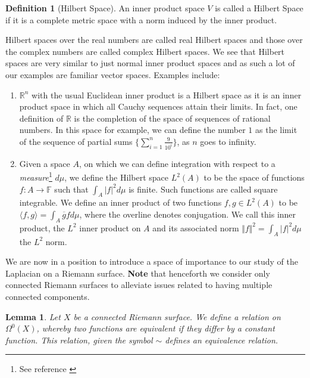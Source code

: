 \documentclass[11pt]{report}
\newtheorem{lemma}[thm]{Lemma}
\theoremstyle{definition}
\newtheorem{defn}[thm]{Definition}
\begin{document}
\begin{defn}[Hilbert Space]
  An inner product space $V$ is called a Hilbert Space if it is a complete metric space with a norm induced by the inner product.
\end{defn}
Hilbert spaces over the real numbers are called real Hilbert spaces and those over the complex numbers are called complex Hilbert spaces. We see that Hilbert spaces are very similar to just normal inner product spaces and as such a lot of our examples are familiar vector spaces. Examples include:
\begin{enumerate}
  \item $\mathbb{R}^n$ with the usual Euclidean inner product is a Hilbert space as it is an inner product space in which all Cauchy sequences attain their limits. In fact, one definition of $\mathbb{R}$ is the completion of the space of sequences of rational numbers. In this space for example, we can define the number $1$ as the limit of the sequence of partial sums $\{\sum\limits_{i=1}^n\frac{9}{10^i}\}$, as $n$ goes to infinity.
  \item Given a space $A$, on which we can define integration with respect to a \emph{measure}\footnote{See reference \cite[Chapter 11]{babyRudin}} $d\mu$, we define the Hilbert space $L^2(A)$ to be the space of functions $f: A \rightarrow \mathbb{F}$ such that $\int_A |f|^2 d\mu$ is finite. Such functions are called square integrable. We define an inner product of two functions $f,g \in L^2(A)$ to be $\langle f, g\rangle = \int_A \overline{g} f d\mu$, where the overline denotes conjugation. We call this inner product, the $L^2$ inner product on $A$ and its associated norm $\Vert f \Vert^2 = \int_A |f|^2 d\mu$ the $L^2$ norm.
\end{enumerate}

We are now in a position to introduce a space of importance to our study of the Laplacian on a Riemann surface. \textbf{Note} that henceforth we consider only connected Riemann surfaces to alleviate issues related to having multiple connected components.

\begin{lemma}
  Let $X$ be a connected Riemann surface. We define a relation on $\Omega^0(X)$, whereby two functions are equivalent if they differ by a constant function. This relation, given the symbol $\sim$ defines an equivalence relation.
\end{lemma}
\end{document}
